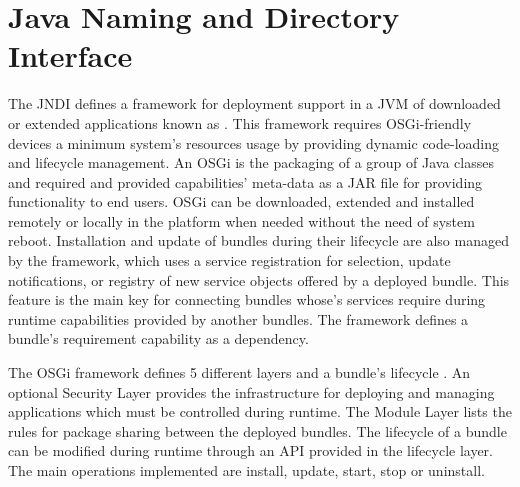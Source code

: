 \section{Java Naming and Directory Interface}
\label{sec:jndi}

The \ac{JNDI} defines a framework for deployment support in a \ac{JVM} of downloaded or extended applications known as . This framework requires OSGi-friendly devices a minimum system's resources usage by providing dynamic code-loading and  lifecycle management. An \ac{OSGi}  is the packaging of a group of Java classes and required and provided capabilities' meta-data as a JAR file for providing functionality to end users. \ac{OSGi}  can be downloaded, extended and installed remotely or locally in the platform when needed without the need of system reboot. Installation and update of bundles during their lifecycle are also managed by the framework, which uses a service registration for selection, update notifications, or registry of new service objects offered by a deployed bundle. This feature is the main key for connecting bundles whose's services require during runtime capabilities provided by another bundles. The framework defines a bundle's requirement capability as a dependency.      

The \ac{OSGi} framework defines 5 different layers and a bundle's lifecycle \cite{OSGi2011}. An optional Security Layer provides the infrastructure for deploying and managing applications which must be controlled during runtime. The Module Layer lists the rules for package sharing between the deployed bundles. The lifecycle of a bundle can be modified during runtime through an API provided in the lifecycle layer. The main operations implemented are install, update, start, stop or uninstall. 
